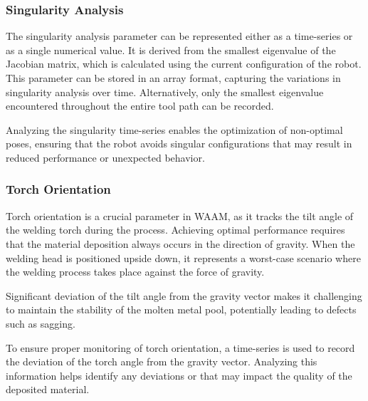 \subsubsection*{Singularity Analysis}
The singularity analysis parameter can be represented either as a time-series or as a single numerical value. It is derived from the smallest eigenvalue of the Jacobian matrix, which is calculated using the current configuration of the robot. This parameter can be stored in an array format, capturing the variations in singularity analysis over time. Alternatively, only the smallest eigenvalue encountered throughout the entire tool path can be recorded.

Analyzing the singularity time-series enables the optimization of non-optimal poses, ensuring that the robot avoids singular configurations that may result in reduced performance or unexpected behavior.



\subsubsection*{Torch Orientation}
Torch orientation is a crucial parameter in WAAM, as it tracks the tilt angle of the welding torch during the process. Achieving optimal performance requires that the material deposition always occurs in the direction of gravity. When the welding head is positioned upside down, it represents a worst-case scenario where the welding process takes place against the force of gravity.

Significant deviation of the tilt angle from the gravity vector makes it challenging to maintain the stability of the molten metal pool, potentially leading to defects such as sagging.

To ensure proper monitoring of torch orientation, a time-series is used to record the deviation of the torch angle from the gravity vector. Analyzing this information helps identify any deviations or that may impact the quality of the deposited material.







